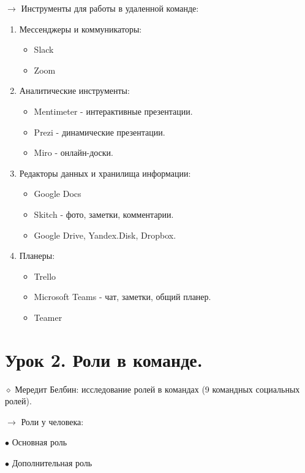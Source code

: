 \documentclass[12pt,a4paper]{report}
\begin{document}
\bigskip
$\rightarrow$ Инструменты для работы в удаленной команде:
\begin{enumerate}
	\item Мессенджеры и коммуникаторы:
	\begin{itemize}
		\item Slack
		\item Zoom
	\end{itemize}
	\item Аналитические инструменты:
	\begin{itemize}
		\item Mentimeter - интерактивные презентации.
		\item Prezi - динамические презентации.
		\item Miro - онлайн-доски.
	\end{itemize}
	\item Редакторы данных и хранилища информации:
	\begin{itemize}
		\item Google Docs
		\item Skitch - фото, заметки, комментарии.
		\item Google Drive, Yandex.Disk, Dropbox.
	\end{itemize}
	\item Планеры:
	\begin{itemize}
		\item Trello
		\item Microsoft Teams - чат, заметки, общий планер.
		\item Teamer
	\end{itemize}
\end{enumerate}

\newpage
\section*{Урок 2. Роли в команде.}
$\diamond$ Мередит Белбин: исследование ролей в командах (9 командных социальных ролей).

\medskip 
$\rightarrow$ Роли у человека:

\smallskip
$\bullet$ Основная роль

$\bullet$ Дополнительная роль
\end{document}

